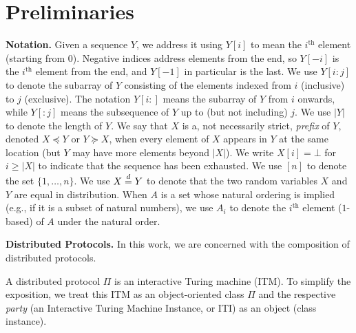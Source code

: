 \section{Preliminaries}

\noindent
\textbf{Notation.}
Given a sequence $Y$, we address it using $Y[i]$ to mean the $i^\text{th}$ element (starting from $0$).
Negative indices address elements from the end, so $Y[-i]$ is the $i^\text{th}$ element from
the end, and $Y[-1]$ in particular is the last. We use $Y[i{:}j]$ to denote the subarray of $Y$
consisting of the elements indexed from $i$ (inclusive) to $j$ (exclusive). The notation $Y[i{:}]$ means the
subarray of $Y$ from $i$ onwards, while $Y[{:}j]$ means the subsequence of $Y$ up to (but not including) $j$.
We use $|Y|$ to denote the length of $Y$.
We say that $X$ is a, not necessarily strict,
\emph{prefix} of $Y$, denoted $X \preceq Y$
or $Y \succeq X$,
when every element of $X$ appears in $Y$ at the
same location (but $Y$ may have more elements beyond $|X|$).
We write $X[i] = \bot$ for $i \geq |X|$ to indicate that the sequence
has been exhausted.
We use $[n]$ to denote the set $\{1, \ldots, n\}$.
We use $X \distreq Y$ to denote that the two random variables $X$ and $Y$
are equal in distribution.
When $A$ is a set whose natural ordering is implied (e.g., if it is a subset
of natural numbers), we use $A_i$ to denote the $i^\text{th}$ element ($1$-based)
of $A$ under the natural order.

\noindent
\textbf{Distributed Protocols.}
In this work, we are concerned with the composition of distributed
protocols.

A distributed protocol $\Pi$ is an interactive Turing machine (ITM).
To simplify the exposition, we treat this ITM
as an object-oriented class $\Pi$ and the respective \emph{party}
(an Interactive Turing Machine Instance, or ITI) as an object (class instance).

